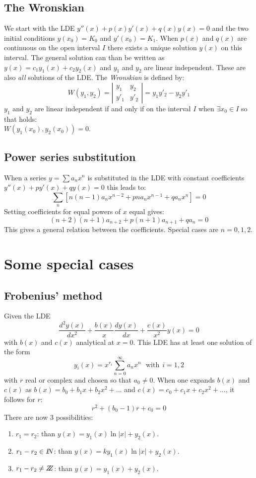 \documentclass[twoside]{report}
\begin{document}
\subsection{The Wronskian}
We start with the LDE $y''(x)+p(x)y'(x)+q(x)y(x)=0$ and the two initial conditions
$y(x_0)=K_0$ and $y'(x_0)=K_1$. When $p(x)$ and $q(x)$ are continuous on the open
interval $I$ there exists a unique solution $y(x)$ on this interval.
\npar
The general solution can than be written as $y(x)=c_1y_1(x)+c_2y_2(x)$ and
$y_1$ and $y_2$ are linear independent. These are also {\it all} solutions of
the LDE.
\npar
The {\it Wronskian} is defined by:
\[
W(y_1,y_2)=
\left|\begin{array}{cc}
y_1&y_2\\
y'_1&y'_2
\end{array}\right|=y_1y'_2-y_2y'_1
\]
$y_1$ and $y_2$ are linear independent if and only if on the interval
$I$ when $\exists x_0\in I$ so that holds:\\
$W(y_1(x_0),y_2(x_0))=0$.

\subsection{Power series substitution}
When a series $y=\sum a_nx^n$ is substituted in the LDE with constant
coefficients $y''(x)+py'(x)+qy(x)=0$ this leads to:
\[
\sum_n\left[n(n-1)a_nx^{n-2}+pna_nx^{n-1}+qa_nx^n\right]=0
\]
Setting coefficients for equal powers of $x$ equal gives:
\[
(n+2)(n+1)a_{n+2}+p(n+1)a_{n+1}+qa_n=0
\]
This gives a general relation between the coefficients. Special cases are
$n=0,1,2$.

\section{Some special cases}
\subsection{Frobenius' method}
Given the LDE
\[
\frac{d^2y(x)}{dx^2}+\frac{b(x)}{x}\frac{dy(x)}{dx}+\frac{c(x)}{x^2}y(x)=0
\]
with $b(x)$ and $c(x)$ analytical at $x=0$. This LDE has at least one solution
of the form
\[
y_i(x)=x^{r_i}\sum_{n=0}^\infty a_nx^n~~~\mbox{with}~~i=1,2
\]
with $r$ real or complex and chosen so that $a_0\neq0$. When one expands $b(x)$
and $c(x)$ as $b(x)=b_0+b_1x+b_2x^2+...$ and $c(x)=c_0+c_1x+c_2x^2+...$, it
follows for $r$:
\[
r^2+(b_0-1)r+c_0=0
\]
There are now 3 possibilities:
\begin{enumerate}
\item $r_1=r_2$: than $y(x)=y_1(x)\ln|x|+y_2(x)$.
\item $r_1-r_2\in I\hspace{-1mm}N$: than $y(x)=ky_1(x)\ln|x|+y_2(x)$.
\item $r_1-r_2\neq Z\hspace{-1ex}Z$: than $y(x)=y_1(x)+y_2(x)$.
\end{enumerate}
\end{document}
